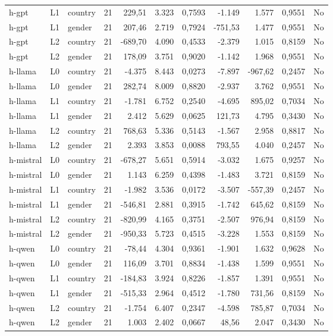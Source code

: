 \begin{landscape}
\begin{longtable}{lllrrrrrrrl}
h-gpt & L1 & country & 21 & 229,51 & 3.323 & 0,7593 & -1.149 & 1.577 & 0,9551 & No \\
h-gpt & L1 & gender & 21 & 207,46 & 2.719 & 0,7924 & -751,53 & 1.477 & 0,9551 & No \\
h-gpt & L2 & country & 21 & -689,70 & 4.090 & 0,4533 & -2.379 & 1.015 & 0,8159 & No \\
h-gpt & L2 & gender & 21 & 178,09 & 3.751 & 0,9020 & -1.142 & 1.968 & 0,9551 & No \\
h-llama & L0 & country & 21 & -4.375 & 8.443 & 0,0273 & -7.897 & -967,62 & 0,2457 & No \\
h-llama & L0 & gender & 21 & 282,74 & 8.009 & 0,8820 & -2.937 & 3.762 & 0,9551 & No \\
h-llama & L1 & country & 21 & -1.781 & 6.752 & 0,2540 & -4.695 & 895,02 & 0,7034 & No \\
h-llama & L1 & gender & 21 & 2.412 & 5.629 & 0,0625 & 121,73 & 4.795 & 0,3430 & No \\
h-llama & L2 & country & 21 & 768,63 & 5.336 & 0,5143 & -1.567 & 2.958 & 0,8817 & No \\
h-llama & L2 & gender & 21 & 2.393 & 3.853 & 0,0088 & 793,55 & 4.040 & 0,2457 & No \\
h-mistral & L0 & country & 21 & -678,27 & 5.651 & 0,5914 & -3.032 & 1.675 & 0,9257 & No \\
h-mistral & L0 & gender & 21 & 1.143 & 6.259 & 0,4398 & -1.483 & 3.721 & 0,8159 & No \\
h-mistral & L1 & country & 21 & -1.982 & 3.536 & 0,0172 & -3.507 & -557,39 & 0,2457 & No \\
h-mistral & L1 & gender & 21 & -546,81 & 2.881 & 0,3915 & -1.742 & 645,62 & 0,8159 & No \\
h-mistral & L2 & country & 21 & -820,99 & 4.165 & 0,3751 & -2.507 & 976,94 & 0,8159 & No \\
h-mistral & L2 & gender & 21 & -950,33 & 5.723 & 0,4515 & -3.228 & 1.553 & 0,8159 & No \\
h-qwen & L0 & country & 21 & -78,44 & 4.304 & 0,9361 & -1.901 & 1.632 & 0,9628 & No \\
h-qwen & L0 & gender & 21 & 116,09 & 3.701 & 0,8834 & -1.438 & 1.599 & 0,9551 & No \\
h-qwen & L1 & country & 21 & -184,83 & 3.924 & 0,8226 & -1.857 & 1.391 & 0,9551 & No \\
h-qwen & L1 & gender & 21 & -515,33 & 2.964 & 0,4512 & -1.780 & 731,56 & 0,8159 & No \\
h-qwen & L2 & country & 21 & -1.754 & 6.407 & 0,2347 & -4.598 & 785,87 & 0,7034 & No \\
h-qwen & L2 & gender & 21 & 1.003 & 2.402 & 0,0667 & 48,56 & 2.047 & 0,3430 & No \\
\end{longtable}
\end{landscape}
